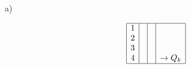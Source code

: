 a)

\[
\begin{array}{|c|c|c|c|}
\hline
1 & & & \\
2 & & & \\
3 & & & \\
4 & & & \rightarrow Q_k \\
\hline
\end{array}
\]